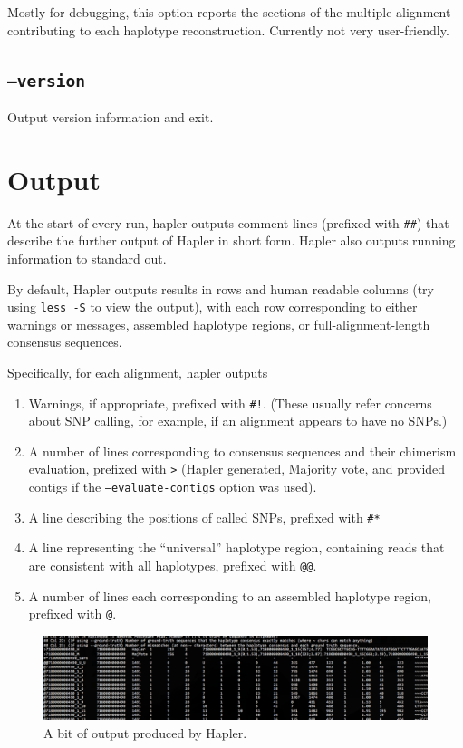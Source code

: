 \documentclass[11pt]{llncs}
\begin{document}
Mostly for debugging, this option reports the sections of the multiple alignment contributing to each haplotype reconstruction. Currently
not very user-friendly.


\subsection{\texttt{--version}}

Output version information and exit.

\newpage


\section{Output}
\label{output}

At the start of every run, hapler outputs comment lines (prefixed with \texttt{\#\#}) that describe the further output of Hapler in short form. Hapler
also outputs running information to standard out.

By default, Hapler outputs results in rows and human readable columns (try using \texttt{less -S} to view the output), with each row 
corresponding to either warnings or messages, assembled haplotype regions, or full-alignment-length consensus sequences. 

Specifically, for each alignment, hapler outputs 

\begin{enumerate}
\item Warnings, if appropriate, prefixed with \texttt{\#!}. (These usually refer concerns about SNP calling, for example, if an alignment appears to have no SNPs.)
\item A number of lines corresponding to consensus sequences and their chimerism evaluation, prefixed with \texttt{>} (Hapler generated, Majority vote, and provided contigs if the \texttt{--evaluate-contigs} option was used).
\item A line describing the positions of called SNPs, prefixed with \verb=#*=
\item A line representing the ``universal'' haplotype region, containing reads that are consistent with all haplotypes, prefixed with \texttt{@@}.
\item A number of lines each corresponding to an assembled haplotype region, prefixed with \texttt{@}. 
\end{enumerate}

\begin{figure}[!h]
\centering
   \includegraphics[width=\textwidth]{graphics/hapler_output}
   \caption{A bit of output produced by Hapler.}
   \label{haplerOutput}
\end{figure}
\end{document}
